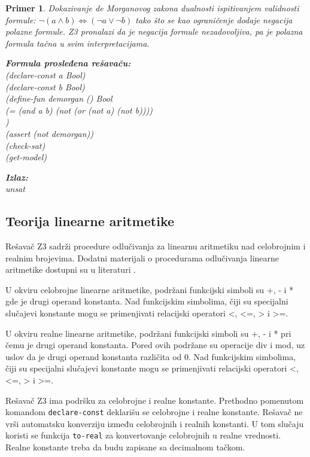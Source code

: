 \documentclass[12pt,oneside]{memoir}
\newcommand\tab[1][0.5cm]{\hspace*{#1}}
\newtheorem{primer}{Primer}
\begin{document}
\begin{primer} Dokazivanje de Morganovog zakona dualnosti ispitivanjem validnosti formule: $\neg{(a \land b)} \Leftrightarrow (\neg{a} \lor \neg{b}) $ tako što se kao ograničenje dodaje negacija polazne formule. Z3 pronalazi da je negacija formule nezadovoljiva, pa je polazna formula tačna u svim interpretacijama. \\

\hspace{-0.6cm}
\begin{minipage}[b]{0.5\textwidth}
\textbf{Formula prosleđena rešavaču:}
\\(declare-const a Bool)
\\(declare-const b Bool)
\\(define-fun demorgan () Bool
\\\tab (= (and a b) (not (or (not a) (not b))))
\\)
\\(assert (not demorgan))
\\(check-sat) 
\\(get-model)
\end{minipage}
\hspace{1.5cm}
\begin{minipage}[t]{0.4\textwidth}
\vspace{-5.35cm}
\textbf{Izlaz:}
\\unsat
\end{minipage}
\end{primer}


\subsection{Teorija linearne aritmetike} 

Rešavač Z3 sadrži procedure odlučivanja za linearnu aritmetiku nad celobrojnim i realnim brojevima. Dodatni materijali o procedurama odlučivanja linearne aritmetike dostupni su u literaturi \cite{FastLinearArithmetic}.
\par

U okviru celobrojne linearne aritmetike, podržani funkcijski simboli su +, - i * gde je drugi operand konstanta. Nad funkcijskim simbolima, čiji su specijalni slučajevi konstante mogu se primenjivati relacijski operatori <, <=, > i >=. 
\par
U okviru realne linearne aritmetike, podržani funkcijski simboli su +, - i * pri čemu je drugi operand konstanta. Pored ovih podržane su operacije div i mod, uz uslov da je drugi operand konstanta različita od 0. Nad funkcijskim simbolima, čiji su specijalni slučajevi konstante mogu se primenjivati relacijski operatori <, <=, > i >=. 
\par
Rešavač Z3 ima podršku za celobrojne i realne konstante. Prethodno pomenutom komandom \texttt{declare-const} deklarišu se celobrojne i realne konstante. Rešavač ne vrši automatsku konverziju između celobrojnih i realnih konstanti. U tom slučaju koristi se funkcija \texttt{to-real} za konvertovanje celobrojnih u realne vrednosti.
Realne konstante treba da budu zapisane sa decimalnom tačkom.
\end{document}
